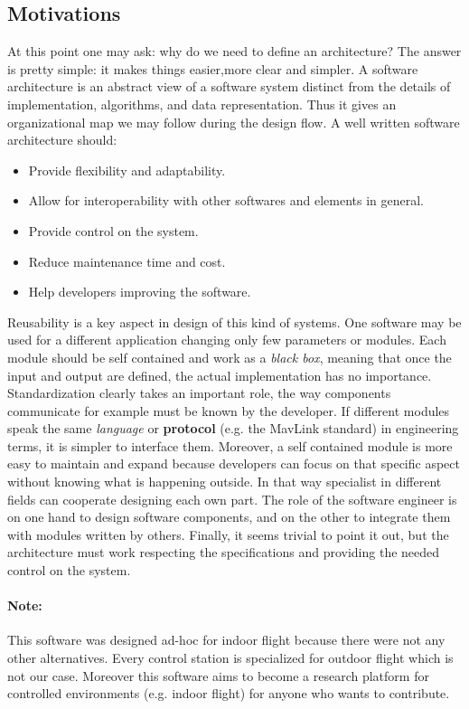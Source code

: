  \subsection{Motivations}
 At this point one may ask: why do we need to define an architecture? The answer is pretty simple: it makes things easier,more clear and simpler. A software architecture is an abstract view of a software system distinct from the details of implementation, algorithms, and data representation. Thus it gives an organizational map we may follow during the design flow. A well written software architecture should:
 \begin{itemize}
 \item Provide flexibility and adaptability.
 \item Allow for interoperability with other softwares and elements in general.
 \item Provide control on the system.
 \item Reduce maintenance time and cost.
 \item Help developers improving the software.
 \end{itemize}
Reusability is a key aspect in design of this kind of systems. One software may be used for a different application changing only few parameters or modules. Each module should be self contained and work as a \textit{black box}, meaning that once the input and output are defined, the actual implementation has no importance. Standardization clearly takes an important role, the way components communicate for example must be known by the developer. If different modules speak the same \textit{language} or \textbf{protocol} (e.g. the MavLink standard) in engineering terms, it is simpler to interface them. Moreover, a self contained module is more easy to maintain and expand because developers can focus on that specific aspect without knowing what is happening outside. In that way specialist in different fields can cooperate designing each own part. The role of the software engineer is on one hand to design software components, and on the other to integrate them with modules written by others. Finally, it seems trivial to point it out, but the architecture must work respecting the specifications and providing the needed control on the system. 

\paragraph{Note:}This software was designed ad-hoc for indoor flight because there were not any other alternatives. Every control station is specialized for outdoor flight which is not our case. Moreover this software aims to become a research platform for controlled environments (e.g. indoor flight) for anyone who wants to contribute.
